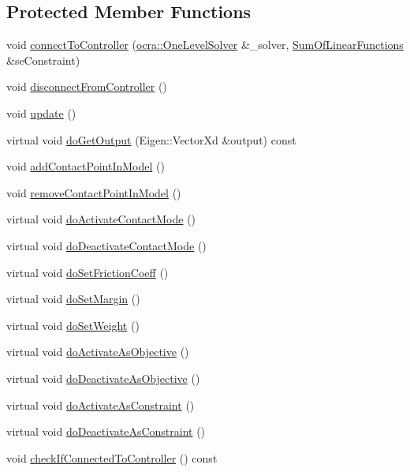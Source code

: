 \subsection*{Protected Member Functions}
\begin{DoxyCompactItemize}
\item 
void \hyperlink{classgocra_1_1GHCJTTask_a021f21b19d0d9de1c067192166f852e6}{connect\+To\+Controller} (\hyperlink{classocra_1_1OneLevelSolver}{ocra\+::\+One\+Level\+Solver} \&\+\_\+solver, \hyperlink{classocra_1_1SumOfLinearFunctions}{Sum\+Of\+Linear\+Functions} \&se\+Constraint)
\item 
void \hyperlink{classgocra_1_1GHCJTTask_a5caec6472d19926a2448779fa629c9d8}{disconnect\+From\+Controller} ()
\item 
void \hyperlink{classgocra_1_1GHCJTTask_a5c2a49cb14720321fdfb91c899f87dac}{update} ()
\item 
virtual void \hyperlink{classgocra_1_1GHCJTTask_a528dbb109bae2cc8409fef6d9c526501}{do\+Get\+Output} (Eigen\+::\+Vector\+Xd \&output) const 
\item 
void \hyperlink{classgocra_1_1GHCJTTask_aee61104908f043c77611e2b3b573d103}{add\+Contact\+Point\+In\+Model} ()
\item 
void \hyperlink{classgocra_1_1GHCJTTask_a818c6077d8325b963e3c72e41a03fe86}{remove\+Contact\+Point\+In\+Model} ()
\item 
virtual void \hyperlink{classgocra_1_1GHCJTTask_a22fe7a1bd0de44d7f51a250baf7796a8}{do\+Activate\+Contact\+Mode} ()
\item 
virtual void \hyperlink{classgocra_1_1GHCJTTask_a20b391cbb8d62237216624db57d0f634}{do\+Deactivate\+Contact\+Mode} ()
\item 
virtual void \hyperlink{classgocra_1_1GHCJTTask_ab05c45917bde9d97f166356f96ee7f95}{do\+Set\+Friction\+Coeff} ()
\item 
virtual void \hyperlink{classgocra_1_1GHCJTTask_ab2a09a00c8e1a2ffef7bd80b40aaeee1}{do\+Set\+Margin} ()
\item 
virtual void \hyperlink{classgocra_1_1GHCJTTask_a4966871ab447bff90495c057725e7122}{do\+Set\+Weight} ()
\item 
virtual void \hyperlink{classgocra_1_1GHCJTTask_a81a6df22509e5e98902e5ac33a43dfed}{do\+Activate\+As\+Objective} ()
\item 
virtual void \hyperlink{classgocra_1_1GHCJTTask_a65593378b928021c5506e2eb6dc9a9c5}{do\+Deactivate\+As\+Objective} ()
\item 
virtual void \hyperlink{classgocra_1_1GHCJTTask_a3fbf21222cf652bb5563b72416a97cda}{do\+Activate\+As\+Constraint} ()
\item 
virtual void \hyperlink{classgocra_1_1GHCJTTask_a2274fda92c62d88a6b4b35286606c41c}{do\+Deactivate\+As\+Constraint} ()
\item 
void \hyperlink{classgocra_1_1GHCJTTask_afaad479f4042d2ecdb0cc9f8b2d4dc98}{check\+If\+Connected\+To\+Controller} () const 
\end{DoxyCompactItemize}
